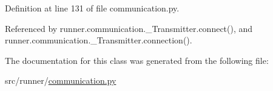 Definition at line 131 of file communication.\+py.



Referenced by runner.\+communication.\+\_\+\+Transmitter.\+connect(), and runner.\+communication.\+\_\+\+Transmitter.\+connection().



The documentation for this class was generated from the following file\+:\begin{DoxyCompactItemize}
\item 
src/runner/\hyperlink{communication_8py}{communication.\+py}\end{DoxyCompactItemize}
